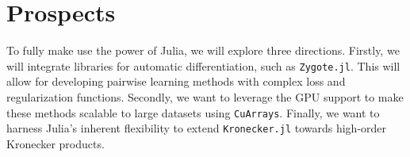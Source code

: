 \documentclass{juliacon}
\begin{document}
\section{Prospects}

To fully make use the power of Julia, we will explore three directions. Firstly, we will integrate libraries for automatic differentiation, such as \texttt{Zygote.jl}. This will allow for developing pairwise learning methods with complex loss and regularization functions. Secondly, we want to leverage the GPU support to make these methods scalable to large datasets using \texttt{CuArrays}. Finally, we want to harness Julia's inherent flexibility to extend \texttt{Kronecker.jl} towards high-order Kronecker products.


\end{document}
